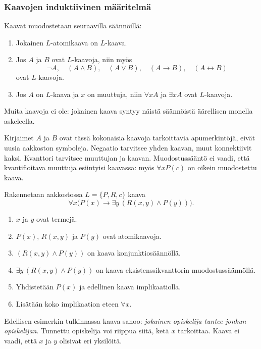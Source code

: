 \documentclass[11pt,a4paper]{amsart}
\begin{document}
\clearpage
\subsubsection{Kaavojen induktiivinen määritelmä}

\begin{definition}[$L$-kaavat]
  Kaavat muodostetaan seuraavilla säännöillä:
  \begin{enumerate}
    \item Jokainen $L$-atomikaava on $L$-kaava.
    \item Jos $A$ ja $B$ ovat $L$-kaavoja, niin myös
      \[
        \neg A,\quad (A\land B),\quad (A\lor B),\quad
        (A\to B),\quad (A\leftrightarrow B)
      \]
      ovat $L$-kaavoja.
    \item Jos $A$ on $L$-kaava ja $x$ on muuttuja, niin
      $\forall x A$ ja $\exists x A$ ovat $L$-kaavoja.
  \end{enumerate}
  Muita kaavoja ei ole: jokainen kaava syntyy näistä säännöistä
  äärellisen monella askeleella.
\end{definition}

Kirjaimet $A$ ja $B$ ovat tässä kokonaisia kaavoja tarkoittavia
apumerkintöjä, eivät uusia aakkoston symboleja. Negaatio tarvitsee yhden
kaavan, muut konnektiivit kaksi. Kvanttori tarvitsee muuttujan ja kaavan.
Muodostussääntö ei vaadi, että kvantifioitava muuttuja esiintyisi kaavassa:
myös $\forall x P(c)$ on oikein muodostettu kaava.

\begin{example}
  Rakennetaan aakkostossa $L=\{P,R,c\}$ kaava
  \[
    \forall x\bigl(P(x)\to\exists y\,(R(x,y)\land P(y))\bigr).
  \]
  \begin{enumerate}
    \item $x$ ja $y$ ovat termejä.
    \item $P(x)$, $R(x,y)$ ja $P(y)$ ovat atomikaavoja.
    \item $(R(x,y)\land P(y))$ on kaava konjunktiosäännöllä.
    \item $\exists y\,(R(x,y)\land P(y))$ on kaava
      eksistenssikvanttorin muodostussäännöllä.
    \item Yhdistetään $P(x)$ ja edellinen kaava implikaatiolla.
    \item Lisätään koko implikaation eteen $\forall x$.
  \end{enumerate}
  Edellisen esimerkin tulkinnassa kaava sanoo:
  \emph{jokainen opiskelija tuntee jonkun opiskelijan}.
  Tunnettu opiskelija voi riippua siitä, ketä $x$ tarkoittaa.
  Kaava ei vaadi, että $x$ ja $y$ olisivat eri yksilöitä.
\end{example}
\end{document}
